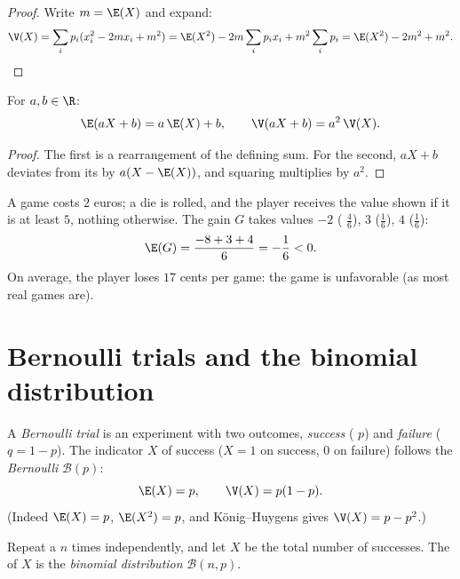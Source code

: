 \begin{proof}
Write $m = \E(X)$ and expand:
\[
\V(X) = \sum_i p_i (x_i^2 - 2m x_i + m^2)
= \E(X^2) - 2m\sum_i p_i x_i + m^2\sum_i p_i
= \E(X^2) - 2m^2 + m^2 . \qedhere
\]
\end{proof}

\begin{proposition}\label{prop:g12:randvar:affine}
For $a, b \in \R$:
\[
\E(aX + b) = a\,\E(X) + b, \qquad
\V(aX + b) = a^2\,\V(X) .
\]
\end{proposition}

\begin{proof}
The first is a rearrangement of the defining sum. For the second, $aX + b$
deviates from its  by $a(X - \E(X))$, and squaring multiplies by
$a^2$.
\end{proof}

\begin{example}\label{ex:g12:randvar:game}
A game costs $2$ euros; a die is rolled, and the player receives the value
shown if it is at least $5$, nothing otherwise. The gain $G$ takes values
$-2$ ( $\frac46$), $3$ ($\frac16$), $4$ ($\frac16$):
\[
\E(G) = \frac{-8 + 3 + 4}{6} = -\frac{1}{6} < 0 .
\]
On average, the player loses $17$ cents per game: the game is unfavorable
(as most real games are).
\end{example}

\section{Bernoulli trials and the binomial distribution}

\begin{definition}\label{def:g12:randvar:bernoulli}
A \emph{Bernoulli trial} is an experiment with two
outcomes, \emph{success} ( $p$) and \emph{failure}
($q = 1 - p$). The indicator $X$ of success ($X = 1$ on success, $0$ on
failure) follows the \emph{Bernoulli } $\mathcal B(p)$:
\[
\E(X) = p, \qquad \V(X) = p(1-p) .
\]
(Indeed $\E(X) = p$, $\E(X^2) = p$, and König--Huygens gives
$\V(X) = p - p^2$.)
\end{definition}

\begin{definition}\label{def:g12:randvar:binomial}
Repeat a  $n$ times independently, and let $X$ be the total
number of successes. The  of $X$ is the \emph{binomial
distribution} $\mathcal B(n, p)$.
\end{definition}

